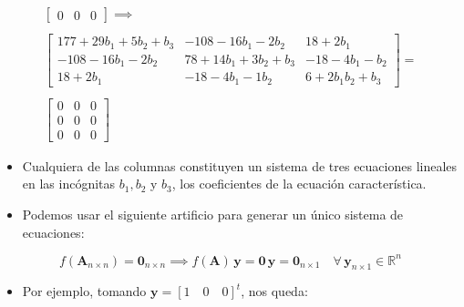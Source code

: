 \documentclass[openany]{book}
\providecommand{\tightlist}{%
  \setlength{\itemsep}{0pt}\setlength{\parskip}{0pt}}
\begin{document}
\begin{gather*}
\begin{bmatrix}
    0 & 0 & 0    
\end{bmatrix}
\implies \\ \\
\begin{bmatrix}        
    177 + 29 b_1 + 5 b_2 + b_3 &   -108-16  b_1 -2  b_2       &  18 +2  b_1              \\ 
    -108 -16  b_1 -2  b_2      &  78  + 14 b_1 + 3 b_2 + b_3  &   -18 -4  b_1 -  b_2     \\
    18+2  b_1                  &   -18 -4  b_1 -1  b_2        &   6 + 2 b_1   b_2 + b_3
\end{bmatrix} = \\ \\
\begin{bmatrix} 
    0 & 0 & 0 \\ 
    0 & 0 & 0 \\
    0 & 0 & 0    
\end{bmatrix}
\end{gather*}

\begin{itemize}
\item
  Cualquiera de las columnas constituyen un sistema de tres ecuaciones lineales en las incógnitas \(b_1, b_2\) y \(b_3\), los coeficientes de la ecuación característica.
\item
  Podemos usar el siguiente artificio para generar un único sistema de ecuaciones:
\end{itemize}

\[
f(\textbf{A}_{n\times n}) = \textbf{0}_{n\times n} \implies f(\textbf{A})  \, \textbf{y}= \textbf{0}\, \textbf{y}  = \textbf{0}_{n\times 1}  \quad \forall \, \textbf{y}_{n\times 1} \in \mathbb{R}^n
\]

\begin{itemize}
\tightlist
\item
  Por ejemplo, tomando \(\textbf{y} = [1 \quad 0 \quad 0]^t\), nos queda:
\end{itemize}
\end{document}
